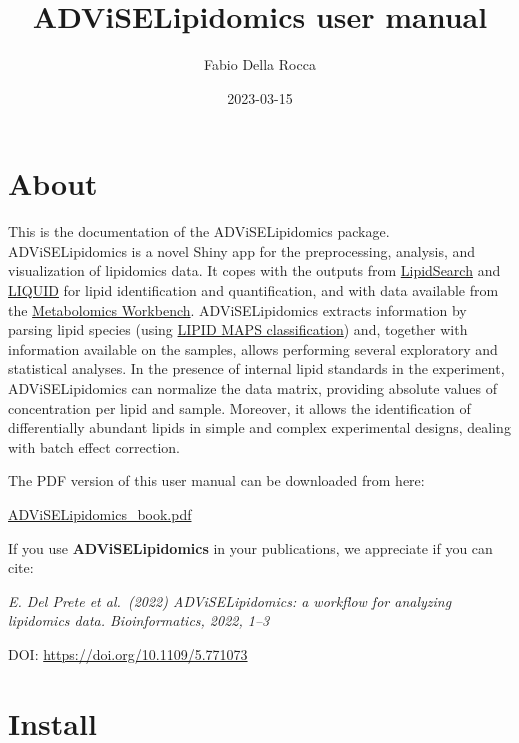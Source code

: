 \documentclass[
]{book}
\title{ADViSELipidomics user manual}
\author{Fabio Della Rocca}
\date{2023-03-15}
\begin{document}
\maketitle

{
\setcounter{tocdepth}{1}
\tableofcontents
}
\hypertarget{about}{%
\chapter{About}\label{about}}

This is the documentation of the ADViSELipidomics package. ADViSELipidomics is a novel Shiny app for the preprocessing, analysis, and visualization of lipidomics data. It copes with the outputs from \href{https://www.thermofisher.com/it/en/home/industrial/mass-spectrometry/liquid-chromatography-mass-spectrometry-lc-ms/lc-ms-software/multi-omics-data-analysis/lipid-search-software.html}{LipidSearch} and \href{https://github.com/PNNL-Comp-Mass-Spec/LIQUID}{LIQUID} for lipid identification and quantification, and with data available from the \href{https://www.metabolomicsworkbench.org/}{Metabolomics Workbench}. ADViSELipidomics extracts information by parsing lipid species (using \href{https://www.lipidmaps.org/data/classification/lipid_cns.html}{LIPID MAPS classification}) and, together with information available on the samples, allows performing several exploratory and statistical analyses. In the presence of internal lipid standards in the experiment, ADViSELipidomics can normalize the data matrix, providing absolute values of concentration per lipid and sample. Moreover, it allows the identification of differentially abundant lipids in simple and complex experimental designs, dealing with batch effect correction.

The PDF version of this user manual can be downloaded from here:

\href{https://github.com/ShinyFabio/ADViSELipidomics_book/raw/main/docs/ADViSELipidomics_book.pdf}{ADViSELipidomics\_book.pdf}

If you use \textbf{ADViSELipidomics} in your publications, we appreciate if you can cite:

\emph{E. Del Prete et al.~(2022) ADViSELipidomics: a workflow for analyzing lipidomics data. Bioinformatics, 2022, 1--3}

DOI: \url{https://doi.org/10.1109/5.771073}

\hypertarget{install}{%
\chapter{Install}\label{install}}
\end{document}
